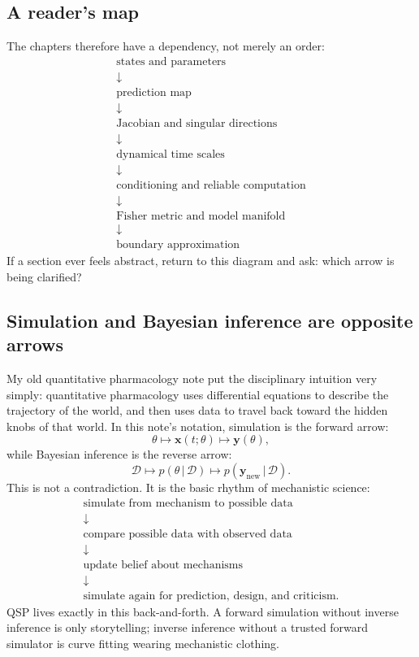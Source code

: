 \documentclass[a4paper]{article}
\newcommand{\vect}[1]{\mathbf{#1}}
\newcommand{\param}{\theta}
\newcommand{\data}{\mathcal{D}}
\newcommand{\given}{\,|\,}
\begin{document}
\subsection{A reader's map}

The chapters therefore have a dependency, not merely an order:
\[
\begin{array}{c}
  \text{states and parameters}\\
  \downarrow\\
  \text{prediction map}\\
  \downarrow\\
  \text{Jacobian and singular directions}\\
  \downarrow\\
  \text{dynamical time scales}\\
  \downarrow\\
  \text{conditioning and reliable computation}\\
  \downarrow\\
  \text{Fisher metric and model manifold}\\
  \downarrow\\
  \text{boundary approximation}
\end{array}
\]
If a section ever feels abstract, return to this diagram and ask: which arrow is being clarified?

\subsection{Simulation and Bayesian inference are opposite arrows}

My old quantitative pharmacology note put the disciplinary intuition very simply: quantitative pharmacology uses differential equations to describe the trajectory of the world, and then uses data to travel back toward the hidden knobs of that world.  In this note's notation, simulation is the forward arrow:
\[
  \param
  \longmapsto
  \vect{x}(t;\param)
  \longmapsto
  \vect{y}(\param),
\]
while Bayesian inference is the reverse arrow:
\[
  \data
  \longmapsto
  p(\param\given\data)
  \longmapsto
  p(\vect{y}_{\mathrm{new}}\given\data).
\]
This is not a contradiction.  It is the basic rhythm of mechanistic science:
\[
  \begin{array}{c}
    \text{simulate from mechanism to possible data}\\
    \downarrow\\
    \text{compare possible data with observed data}\\
    \downarrow\\
    \text{update belief about mechanisms}\\
    \downarrow\\
    \text{simulate again for prediction, design, and criticism.}
  \end{array}
\]
QSP lives exactly in this back-and-forth.  A forward simulation without inverse inference is only storytelling; inverse inference without a trusted forward simulator is curve fitting wearing mechanistic clothing.
\end{document}
